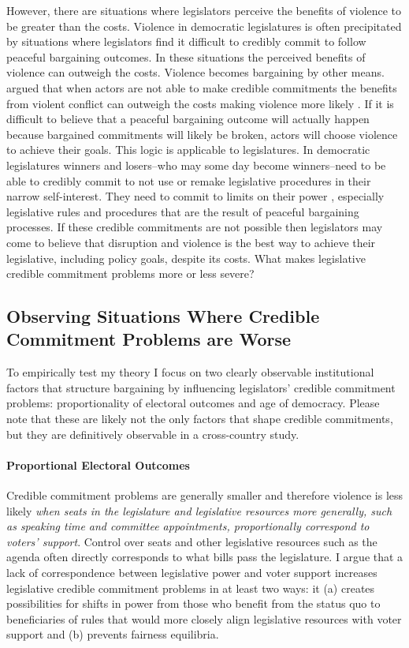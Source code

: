 \documentclass[a4paper]{article}\usepackage[]{graphicx}\usepackage[]{color}
\begin{document}
However, there are situations where legislators perceive the benefits of violence to be greater than the costs. Violence in democratic legislatures is often precipitated by situations where legislators find it difficult to credibly commit to follow peaceful bargaining outcomes. In these situations the perceived benefits of violence can outweigh the costs. Violence becomes bargaining by other means. \cite{Fearon1995} argued that when actors are not able to make credible commitments the benefits from violent conflict can outweigh the costs making violence more likely \cite[see also][]{Powell2006}. If it is difficult to believe that a peaceful bargaining outcome will actually happen because bargained commitments will likely be broken, actors will choose violence to achieve their goals. This logic is applicable to legislatures. In democratic legislatures winners and losers--who may some day become winners--need to be able to credibly commit to not use or remake legislative procedures in their narrow self-interest. They need to commit to limits on their power \citep{riker1982,Gaubatz1996}, especially legislative rules and procedures that are the result of peaceful bargaining processes. If these credible commitments are not possible then legislators may come to believe that disruption and violence is the best way to achieve their legislative, including policy goals, despite its costs. What makes legislative credible commitment problems more or less severe?

\subsection*{Observing Situations Where Credible Commitment Problems are Worse}

To empirically test my theory I focus on two clearly observable institutional factors that structure bargaining by influencing legislators' credible commitment problems: proportionality of electoral outcomes and age of democracy. Please note that these are likely not the only factors that shape credible commitments, but they are definitively observable in a cross-country study.

\paragraph{Proportional Electoral Outcomes}

Credible commitment problems are generally smaller and therefore violence is less likely \emph{when seats in the legislature and legislative resources more generally, such as speaking time and committee appointments, proportionally correspond to voters' support}. Control over seats and other legislative resources such as the agenda often directly corresponds to what bills pass the legislature. I argue that a lack of correspondence between legislative power and voter support increases legislative credible commitment problems in at least two ways: it (a) creates possibilities for shifts in power from those who benefit from the status quo to beneficiaries of rules that would more closely align legislative resources with voter support and (b) prevents fairness equilibria.
\end{document}
